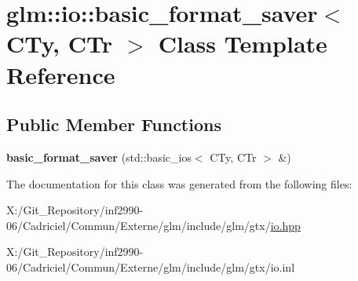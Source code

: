 \hypertarget{classglm_1_1io_1_1basic__format__saver}{\section{glm\-:\-:io\-:\-:basic\-\_\-format\-\_\-saver$<$ C\-Ty, C\-Tr $>$ Class Template Reference}
\label{classglm_1_1io_1_1basic__format__saver}
}
\subsection*{Public Member Functions}
\begin{DoxyCompactItemize}
\item 
\hypertarget{classglm_1_1io_1_1basic__format__saver_a9688fa6dce0c32285527df2336ca9127}{{\bfseries basic\-\_\-format\-\_\-saver} (std\-::basic\-\_\-ios$<$ C\-Ty, C\-Tr $>$ \&)}\label{classglm_1_1io_1_1basic__format__saver_a9688fa6dce0c32285527df2336ca9127}

\end{DoxyCompactItemize}


The documentation for this class was generated from the following files\-:\begin{DoxyCompactItemize}
\item 
X\-:/\-Git\-\_\-\-Repository/inf2990-\/06/\-Cadriciel/\-Commun/\-Externe/glm/include/glm/gtx/\hyperlink{io_8hpp}{io.\-hpp}\item 
X\-:/\-Git\-\_\-\-Repository/inf2990-\/06/\-Cadriciel/\-Commun/\-Externe/glm/include/glm/gtx/io.\-inl\end{DoxyCompactItemize}
